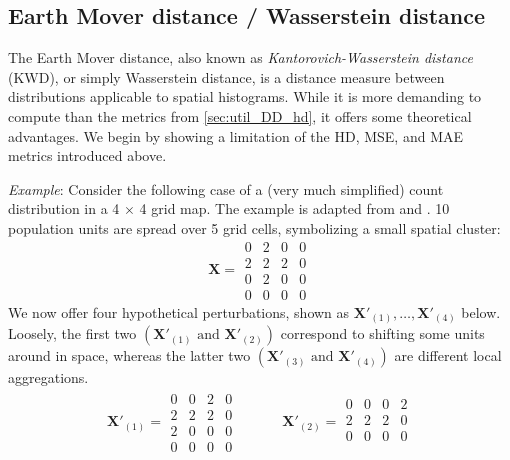 \subsection{Earth Mover distance / Wasserstein distance} \label{sec:util_DD_kwd}

The Earth Mover distance, also known as \emph{Kantorovich-Wasserstein distance} (KWD), or simply Wasserstein distance, is a distance measure between distributions applicable to spatial histograms. While it is more demanding to compute than the metrics from \ref{sec:util_DD_hd}, it offers some theoretical advantages. 
We begin by showing a limitation of the HD, MSE, and MAE metrics introduced above.

\begin{tcolorbox}[breakable]
\emph{Example}:
Consider the following case of a (very much simplified) count distribution in a 4 $\times$ 4 grid map. The example is adapted from \cite{GussenbauerEtAl2023} and \cite{RicciatoGualandi2024}. 10 population units are spread over 5 grid cells, symbolizing a small spatial cluster:
\[
\mathbf{X} = \begin{matrix} 0 & 2 & 0 & 0 \\
                  2 & 2 & 2 & 0 \\
                  0 & 2 & 0 & 0 \\
                  0 & 0 & 0 & 0 \end{matrix}
\]
We now offer four hypothetical perturbations, shown as $\mathbf{X}'_{(1)}, \dots, \mathbf{X}'_{(4)}$ below. Loosely, the first two $(\mathbf{X}'_{(1)} \text{ and } \mathbf{X}'_{(2)})$ correspond to shifting some units around in space, whereas the latter two $(\mathbf{X}'_{(3)} \text{ and } \mathbf{X}'_{(4)})$ are different local aggregations.
\begin{align*}
\mathbf{X}'_{(1)} = \begin{matrix} 0 & 0  & 2 & 0 \\
                          2 & 2  & 2 & 0 \\
                          2 & 0  & 0 & 0 \\
                          0 & 0  & 0 & 0 \end{matrix} & \hspace{1cm}
\mathbf{X}'_{(2)} = \begin{matrix} 0 & 0  & 0 & 2 \\
                          2 & 2  & 2 & 0 \\
                          0 & 0  & 0 & 0 \\

\end{matrix}
\end{align*}
\end{tcolorbox}
